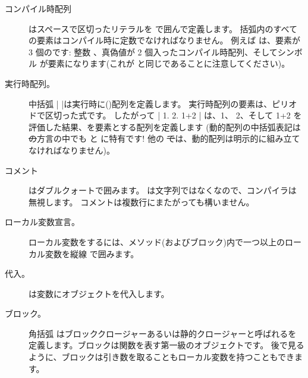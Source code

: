 \documentclass[a4paper,10pt,twoside]{book}
\begin{document}
\begin{description}
\item[コンパイル時配列] はスペースで区切ったリテラルを \ct{#( )} で囲んで定義します。
		括弧内のすべての要素はコンパイル時に定数でなければなりません。
		例えば  は、要素が 3 個のです: 整数 、真偽値が 2 個入ったコンパイル時配列、そしてシンボル  が要素になります(これが  と同じであることに注意してください)。

\item[実行時配列。] 中括弧 \ct|{ }|は実行時に()配列を定義します。
		実行時配列の要素は、ピリオドで区切った式です。
		したがって \ct|{ 1. 2. 1+2 }| は、1、 2、そして 1+2 を評価した結果、を要素とする配列を定義します
		(動的配列の中括弧表記は \st の方言の中でも \pharo と \squeak に特有です!
		他の \st では、動的配列は明示的に組み立てなければなりません)。

\item[コメント] はダブルクォートで囲みます。
		 は文字列ではなくなので、\pharo コンパイラは無視します。
		コメントは複数行にまたがっても構いません。
		
\item[ローカル変数宣言。] ローカル変数をするには、メソッド(およびブロック)内で一つ以上のローカル変数を縦線 \ct{| |} で囲みます。

\item[代入。] \ct{:=} は変数にオブジェクトを代入します。

\item[ブロック。] 角括弧 \ct{[ ]} はブロッククロージャーあるいは静的クロージャーと呼ばれるを定義します。ブロックは関数を表す第一級のオブジェクトです。
		後で見るように、ブロックは引き数を取ることもローカル変数を持つこともできます。


\end{description}
\end{document}
